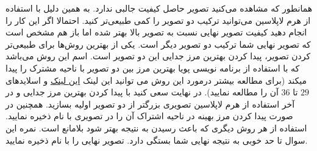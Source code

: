 \documentclass[a4]{article}
\begin{document}
همانطور که مشاهده می‌کنید تصویر حاصل کیفیت جالبی ندارد. به همین دلیل با استفاده از هرم لاپلاسین می‌توانید ترکیب دو تصویر را کمی طبیعی‌تر کنید. احتمالا اگر این کار را انجام دهید کیفیت تصویر نهایی نسبت به تصویر بالا بهتر شده اما باز هم مشخص است که تصویر نهایی شما ترکیب دو تصویر دیگر است‌. یکی از بهترین روش‌ها برای طبیعی‌تر کردن تصویر، پیدا کردن بهترین مرز جدایی این دو تصویر است‌. اسم این روش
می‌باشد که با استفاده از برنامه نویسی پویا
بهترین مرز بین دو تصویر با ناحیه مشترک را پیدا میکند (برای مطالعه بیشتر درمورد این روش  می توانید 
این لینک 
\href{https://courses.engr.illinois.edu/cs445/fa2019/lectures/Lecture%2007%20-%20Texture%20Synthesis%20-%20CP%20Fall%202019.pdf}{این لینک}
و اسلاید‌های $ 29 $ تا $ 36 $ آن را مطالعه نمایید). 
در نهایت سعی کنید با پیدا کردن بهترین مرز جدایی و در آخر استفاده از هرم لاپلاسین تصویری بزرگتر از دو تصویر اولیه بسازید‌. همچنین در صورت پیدا کردن مرز بهینه در ناحیه اشتراک آن را در تصویری با نام
 ذخیره نمایید. استفاده از هر روش دیگری که باعث رسیدن به نتیجه بهتر شود بلامانع است. نمره این سوال تا حد خوبی به نتیجه نهایی شما بستگی دارد. 
 تصویر نهایی را با نام 
  ذخیره نمایید. 
\end{document}
